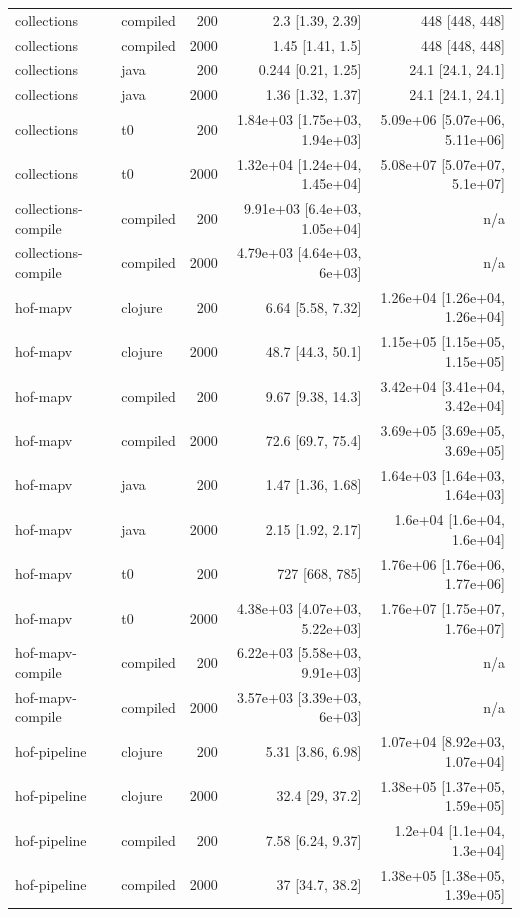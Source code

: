 \begin{tabular}{llrrr}
collections & compiled & 200 & 2.3 [1.39, 2.39] & 448 [448, 448] \\
collections & compiled & 2000 & 1.45 [1.41, 1.5] & 448 [448, 448] \\
collections & java & 200 & 0.244 [0.21, 1.25] & 24.1 [24.1, 24.1] \\
collections & java & 2000 & 1.36 [1.32, 1.37] & 24.1 [24.1, 24.1] \\
collections & t0 & 200 & 1.84e+03 [1.75e+03, 1.94e+03] & 5.09e+06 [5.07e+06, 5.11e+06] \\
collections & t0 & 2000 & 1.32e+04 [1.24e+04, 1.45e+04] & 5.08e+07 [5.07e+07, 5.1e+07] \\
collections-compile & compiled & 200 & 9.91e+03 [6.4e+03, 1.05e+04] & n/a \\
collections-compile & compiled & 2000 & 4.79e+03 [4.64e+03, 6e+03] & n/a \\
hof-mapv & clojure & 200 & 6.64 [5.58, 7.32] & 1.26e+04 [1.26e+04, 1.26e+04] \\
hof-mapv & clojure & 2000 & 48.7 [44.3, 50.1] & 1.15e+05 [1.15e+05, 1.15e+05] \\
hof-mapv & compiled & 200 & 9.67 [9.38, 14.3] & 3.42e+04 [3.41e+04, 3.42e+04] \\
hof-mapv & compiled & 2000 & 72.6 [69.7, 75.4] & 3.69e+05 [3.69e+05, 3.69e+05] \\
hof-mapv & java & 200 & 1.47 [1.36, 1.68] & 1.64e+03 [1.64e+03, 1.64e+03] \\
hof-mapv & java & 2000 & 2.15 [1.92, 2.17] & 1.6e+04 [1.6e+04, 1.6e+04] \\
hof-mapv & t0 & 200 & 727 [668, 785] & 1.76e+06 [1.76e+06, 1.77e+06] \\
hof-mapv & t0 & 2000 & 4.38e+03 [4.07e+03, 5.22e+03] & 1.76e+07 [1.75e+07, 1.76e+07] \\
hof-mapv-compile & compiled & 200 & 6.22e+03 [5.58e+03, 9.91e+03] & n/a \\
hof-mapv-compile & compiled & 2000 & 3.57e+03 [3.39e+03, 6e+03] & n/a \\
hof-pipeline & clojure & 200 & 5.31 [3.86, 6.98] & 1.07e+04 [8.92e+03, 1.07e+04] \\
hof-pipeline & clojure & 2000 & 32.4 [29, 37.2] & 1.38e+05 [1.37e+05, 1.59e+05] \\
hof-pipeline & compiled & 200 & 7.58 [6.24, 9.37] & 1.2e+04 [1.1e+04, 1.3e+04] \\
hof-pipeline & compiled & 2000 & 37 [34.7, 38.2] & 1.38e+05 [1.38e+05, 1.39e+05] \\

\end{tabular}
